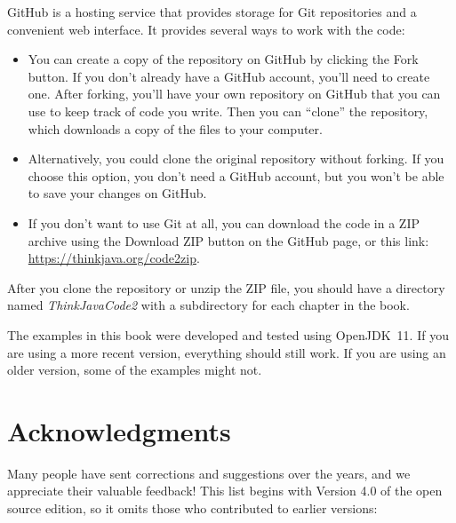 
GitHub is a hosting service that provides storage for Git repositories and a convenient web interface.
It provides several ways to work with the code:

\begin{itemize}

\item You can create a copy of the repository on GitHub by clicking the {\sf Fork} button.
If you don't already have a GitHub account, you'll need to create one.
After forking, you'll have your own repository on GitHub that you can use to keep track of code you write.
Then you can ``clone'' the repository, which downloads a copy of the files to your computer.

\item Alternatively, you could clone the original repository without forking.
If you choose this option, you don't need a GitHub account, but you won't be able to save your changes on GitHub.

\item If you don't want to use Git at all, you can download the code in a ZIP archive using the {\sf Download ZIP} button on the GitHub page, or this link: \url{https://thinkjava.org/code2zip}.

\end{itemize}

After you clone the repository or unzip the ZIP file, you should have a directory named {\it ThinkJavaCode2} with a subdirectory for each chapter in the book.

The examples in this book were developed and tested using OpenJDK~11.
If you are using a more recent version, everything should still work.
If you are using an older version, some of the examples might not.


\section*{Acknowledgments}

Many people have sent corrections and suggestions over the years, and we appreciate their valuable feedback!
This list begins with Version 4.0 of the open source edition, so it omits those who contributed to earlier versions:

